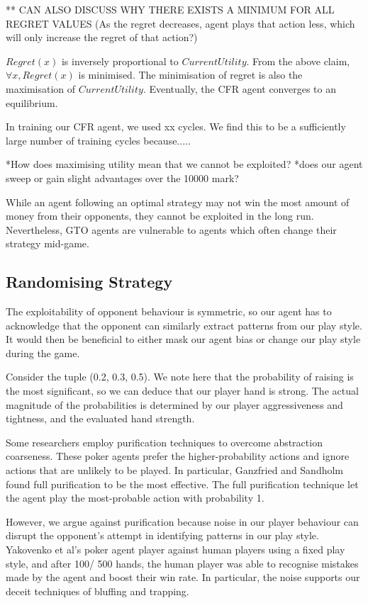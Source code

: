 \documentclass{article}
\begin{document}
** CAN ALSO DISCUSS WHY THERE EXISTS A MINIMUM FOR ALL REGRET VALUES (As the regret decreases, agent plays that action less, which will only increase the regret of that action?)

$Regret(x)$ is inversely proportional to $CurrentUtility$. From the above claim, $\forall x, Regret(x)$ is minimised. The minimisation of regret is also the maximisation of $CurrentUtility$. Eventually, the CFR agent converges to an equilibrium.

In training our CFR agent, we used xx cycles. We find this to be a sufficiently large number of training cycles because.....

*How does maximising utility mean that we cannot be exploited?
*does our agent sweep or gain slight advantages over the 10000 mark?

While an agent following an optimal strategy may not win the most amount of money from their opponents, they cannot be exploited in the long run. Nevertheless, GTO agents are vulnerable to agents which often change their strategy mid-game.

\subsection{Randomising Strategy}

The exploitability of opponent behaviour is symmetric, so our agent has to acknowledge that the opponent can similarly extract patterns from our play style. It would then be beneficial to either mask our agent bias or change our play style during the game.

Consider the tuple (0.2, 0.3, 0.5). We note here that the probability of raising is the most significant, so we can deduce that our player hand is strong. The actual magnitude of the probabilities is determined by our player aggressiveness and tightness, and the evaluated hand strength.

Some researchers employ purification techniques to overcome abstraction coarseness. These poker agents prefer the higher-probability actions and ignore actions that are unlikely to be played. In particular, Ganzfried and Sandholm found full purification to be the most effective. The full purification technique let the agent play the most-probable action with probability 1.

However, we argue against purification because noise in our player behaviour can disrupt the opponent's attempt in identifying patterns in our play style. Yakovenko et al's poker agent player against human players using a fixed play style, and after 100/ 500 hands, the human player was able to recognise mistakes made by the agent and boost their win rate. In particular, the noise supports our deceit techniques of bluffing and trapping.
\end{document}

